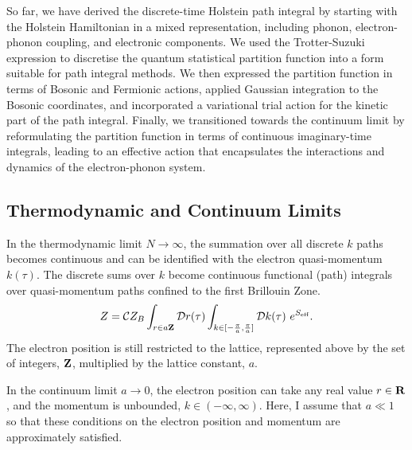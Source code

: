 So far, we have derived the discrete-time Holstein path integral by starting with the Holstein Hamiltonian in a mixed representation, including phonon, electron-phonon coupling, and electronic components. We used the Trotter-Suzuki expression to discretise the quantum statistical partition function into a form suitable for path integral methods. We then expressed the partition function in terms of Bosonic and Fermionic actions, applied Gaussian integration to the Bosonic coordinates, and incorporated a variational trial action for the kinetic part of the path integral. Finally, we transitioned towards the continuum limit by reformulating the partition function in terms of continuous imaginary-time integrals, leading to an effective action that encapsulates the interactions and dynamics of the electron-phonon system.

\subsection{Thermodynamic and Continuum Limits}

In the thermodynamic limit $N\to\infty$, the summation over all discrete $k$ paths becomes continuous and can be identified with the electron quasi-momentum $k(\tau)$. The discrete sums over $k$ become continuous functional (path) integrals over quasi-momentum paths confined to the first Brillouin Zone.
\begin{equation}
    Z = \mathcal{C} Z_B \int_{r \in a \vb{Z}} \mathcal{D}r(\tau) \int_{k \in [-\frac{\pi}{a},\frac{\pi}{a}]}
    \mathcal{D} k(\tau)\ e^{S_{\text{eff}}} .
\end{equation}
The electron position is still restricted to the lattice, represented above by the set of integers, $\vb{Z}$, multiplied by the lattice constant, $a$. 

In the continuum limit $a \to 0$, the electron position can take any real value $r \in \vb{R}$, and the momentum is unbounded, $k \in (-\infty, \infty)$. Here, I assume that $a \ll 1$ so that these conditions on the electron position and momentum are approximately satisfied.

